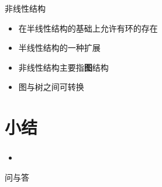 \begin{frame}
    \begin{block}{非线性结构}
        \begin{itemize}
            \item 在半线性结构的基础上允许有环的存在
            \item 半线性结构的一种扩展
            \item 非线性结构主要指\textbf{图}结构
            \item 图与树之间可转换
        \end{itemize}
    \end{block}
\end{frame}

% 
% 
% 


\section{小结}

\begin{frame}
    \frametitle{\insertsectionhead}
    \begin{itemize}
        \item
    \end{itemize}
\end{frame}

\begin{standout}[]
    问与答
\end{standout}